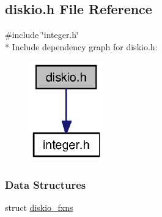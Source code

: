\subsection{diskio.\+h File Reference}
\label{diskio_8h}
{\ttfamily \#include \char`\"{}integer.\+h\char`\"{}}\\*
Include dependency graph for diskio.\+h\+:
\nopagebreak
\begin{figure}[H]
\begin{center}
\leavevmode
\includegraphics[width=91pt]{diskio_8h__incl}
\end{center}
\end{figure}
\subsubsection*{Data Structures}
\begin{DoxyCompactItemize}
\item 
struct \hyperlink{structdiskio__fxns}{diskio\+\_\+fxns}
\end{DoxyCompactItemize}
